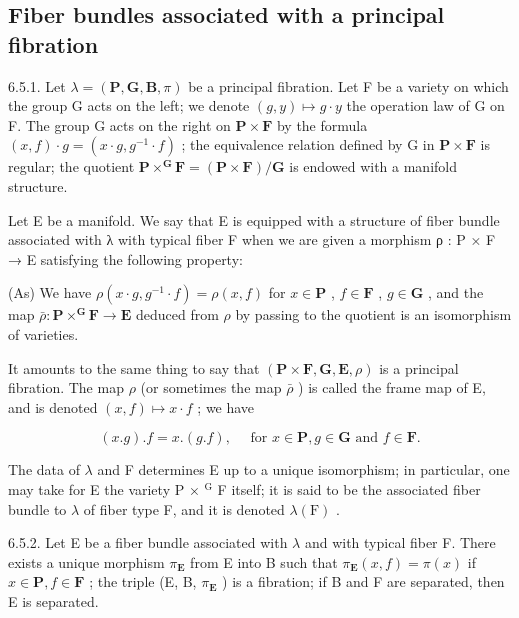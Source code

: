 \subsection{Fiber bundles associated with a principal fibration}

6.5.1. Let \(\lambda = (\mathbf{P}, \mathbf{G}, \mathbf{B}, \pi)\) be a principal fibration. Let F be a variety on which the group G acts on the left; we denote \((g, y) \mapsto g \cdot y\) the operation law of G on F. The group G acts on the right on \(\mathbf{P} \times \mathbf{F}\) by the formula \((x, f) \cdot g = (x \cdot g, g^{-1} \cdot f)\) ; the equivalence relation defined by G in \(\mathbf{P} \times \mathbf{F}\) is regular; the quotient \(\mathbf{P} \times^{\mathbf{G}}\mathbf{F} = (\mathbf{P} \times \mathbf{F}) / \mathbf{G}\) is endowed with a manifold structure.

Let E be a manifold. We say that E is equipped with a structure of fiber bundle associated with λ with typical fiber F when we are given a morphism ρ : P × F → E satisfying the following property:

(As) We have \(\rho(x \cdot g,g^{-1} \cdot f)=\rho(x,f)\) for \(x\in\mathbf{P}\) , \(f\in\mathbf{F}\) , \(g\in\mathbf{G}\) , and the map \(\bar{\rho}:\mathbf{P}\times^{\mathbf{G}}\mathbf{F}\to\mathbf{E}\) deduced from \(\rho\) by passing to the quotient is an isomorphism of varieties.

It amounts to the same thing to say that \((\mathbf{P} \times \mathbf{F}, \mathbf{G}, \mathbf{E}, \rho)\) is a principal fibration. The map \(\rho\) (or sometimes the map \(\bar{\rho}\) ) is called the frame map of E, and is denoted \((x, f) \mapsto x \cdot f\) ; we have

\[
(x. g). f = x. (g. f), \quad \text {   for   } x \in \mathbf {P}, g \in \mathbf {G} \text {   and   } f \in \mathbf {F}.
\]

The data of \(\lambda\) and F determines E up to a unique isomorphism; in particular, one may take for E the variety P × \(^{\text{G}}\) F itself; it is said to be the associated fiber bundle to \(\lambda\) of fiber type F, and it is denoted \(\lambda(\text{F})\) .

6.5.2. Let E be a fiber bundle associated with \(\lambda\) and with typical fiber F. There exists a unique morphism \(\pi_{\mathbf{E}}\) from E into B such that \(\pi_{\mathbf{E}}(x,f)=\pi(x)\) if \(x\in\mathbf{P},f\in\mathbf{F}\) ; the triple (E, B, \(\pi_{\mathbf{E}}\) ) is a fibration; if B and F are separated, then E is separated.

